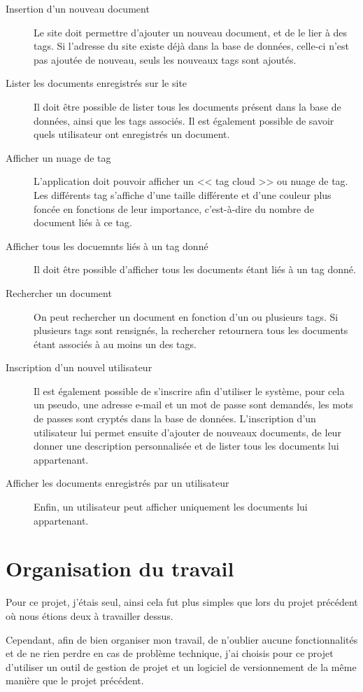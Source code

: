 \documentclass[12pt,a4paper,openany]{book}
\begin{document}
	\begin{description}
		\item[Insertion d'un nouveau document] 
	Le site doit permettre d'ajouter un nouveau document, et de le lier à des tags. Si l'adresse du site existe déjà dans la base de
	données, celle-ci n'est pas ajoutée de nouveau, seuls les nouveaux tags sont ajoutés.
		\item[Lister les documents enregistrés sur le site] 
	Il doit être possible de lister tous les documents présent dans la base de données, ainsi que les tags associés. Il est également
	possible de savoir quels utilisateur ont enregistrés un document.
		\item[Afficher un nuage de tag] 
	L'application doit pouvoir afficher un << tag cloud >> ou nuage de tag. Les différents tag s'affiche d'une taille différente et
	d'une couleur plus foncée en fonctions de leur importance, c'est-à-dire du nombre de document liés à ce tag. 
		\item[Afficher tous les docuemnts liés à un tag donné] 
	Il doit être possible d'afficher tous les documents étant liés à un tag donné.
		\item[Rechercher un document] 
	On peut rechercher un document en fonction d'un ou plusieurs tags. Si plusieurs tags sont rensignés, la rechercher retournera
	tous les documents étant associés à au moins un des tags.
	\item[Inscription d'un nouvel utilisateur] 
	Il est également possible de s'inscrire afin d'utiliser le système, pour cela un pseudo, une adresse e-mail et un mot de passe sont
	demandés, les mots de passes sont cryptés dans la base de données. L'inscription d'un utilisateur lui permet ensuite d'ajouter
	de nouveaux documents, de leur donner une description personnalisée et de lister tous les documents lui appartenant.
	\item[Afficher les documents enregistrés par un utilisateur] 
	Enfin, un utilisateur peut afficher uniquement les doc\-uments lui appartenant.
	\end{description}

	\chapter{Organisation du travail}
	Pour ce projet, j'étais seul, ainsi cela fut plus simples que lors du projet précédent où nous étions deux à travailler dessus. 

	Cependant, afin de bien organiser mon travail, de n'oublier aucune fonctionnalités et de ne rien perdre en cas de problème
	technique, j'ai choisis pour ce projet d'utiliser un outil de gestion de projet et un logiciel de versionnement de la même
	manière que le projet précédent.
\end{document}
